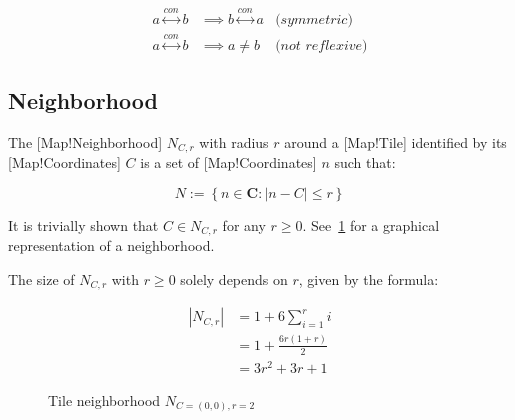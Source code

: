 \begin{align*}
    a \overset{con}{\leftrightarrow} b &\implies
        b \overset{con}{\leftrightarrow} a&\textit{(symmetric)}\\
    a \overset{con}{\leftrightarrow} b &\implies
        a \neq b&\textit{(not reflexive)}
\end{align*}

\subsection{Neighborhood}

The [Map!Neighborhood] \(N_{C,r}\) with radius \(r\) around a [Map!Tile] identified by its [Map!Coordinates] \(C\) is a set of [Map!Coordinates] \(n\) such that:

\begin{equation}\label{eq:map_nbhd}
    N := \left \{ n \in \mathbf{C} : |n - C| \leq r \right \}
\end{equation}

It is trivially shown that \(C \in N_{C,r}\) for any \(r \geq 0\).
See~\ref{fig:map_nbhd} for a graphical representation of a neighborhood.

The size of \(N_{C,r}\) with \(r \geq 0\) solely depends on \(r\), given by the formula:

\begin{align}\label{eq:map_nbhd_size}
    |N_{C,r}| &= 1 + 6\sum_{i=1}^{r}i\nonumber \\
    &= 1 + \frac{6r(1 + r)}{2}\nonumber \\
    &= 3r^2 + 3r + 1
\end{align}

\begin{figure}[htbp]
    \centering
    \caption{Tile neighborhood \(N_{C=(0,0),r=2}\)}\label{fig:map_nbhd}
\end{figure}

